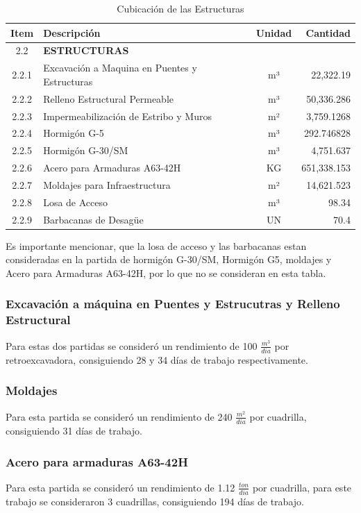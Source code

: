 \documentclass{article} %
\begin{document}
\begin{table}[h!]
    \centering
    \begin{tabular}{|c|l|c|r|}
    \hline
    \textbf{Item} & \textbf{Descripción} & \textbf{Unidad} & \textbf{Cantidad} \\ \hline
    2.2 & \textbf{ESTRUCTURAS} & & \\ \hline
    2.2.1 & Excavación a Maquina en Puentes y Estructuras & m³ & 22,322.19 \\ \hline
    2.2.2 & Relleno Estructural Permeable & m³ & 50,336.286 \\ \hline
    2.2.3 & Impermeabilización de Estribo y Muros & m² & 3,759.1268 \\ \hline
    2.2.4 & Hormigón G-5 & m³ & 292.746828 \\ \hline
    2.2.5 & Hormigón G-30/SM & m³ & 4,751.637 \\ \hline
    2.2.6 & Acero para Armaduras A63-42H & KG & 651,338.153 \\ \hline
    2.2.7 & Moldajes para Infraestructura & m² & 14,621.523 \\ \hline
    2.2.8 & Losa de Acceso & m³ & 98.34 \\ \hline
    2.2.9 & Barbacanas de Desagüe & UN & 70.4 \\ \hline
    \end{tabular}
    \caption{Cubicación de las Estructuras}
\end{table}

Es importante mencionar, que la losa de acceso y las barbacanas estan consideradas en la partida de hormigón G-30/SM, Hormigón G5, moldajes y Acero para Armaduras A63-42H, por lo que no se consideran en esta tabla.

\subsubsection{Excavación a máquina en Puentes y Estrucutras y Relleno Estructural}
Para estas dos partidas se consideró un rendimiento de 100 $\frac{m^3}{dia}$ por retroexcavadora, consiguiendo 28 y 34 días de trabajo respectivamente.

\subsubsection{Moldajes}
Para esta partida se consideró un rendimiento de 240 $\frac{m^2}{dia}$ por cuadrilla, consiguiendo 31 días de trabajo.

\subsubsection{Acero para armaduras A63-42H}
Para esta partida se consideró un rendimiento de 1.12 $\frac{ton}{dia}$ por cuadrilla, para este trabajo se consideraron 3 cuadrillas, consiguiendo 194 días de trabajo.
\end{document}
